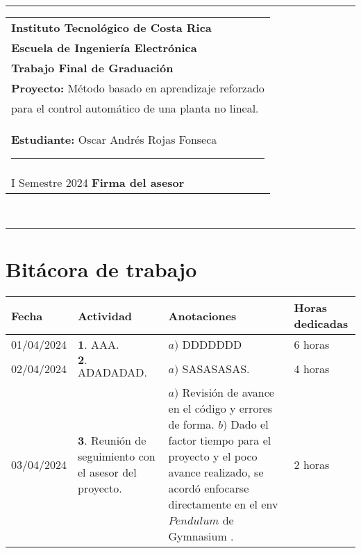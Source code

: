 \documentclass[12pt]{article}
\begin{document}
\hfill\\
\rule{\textwidth}{1.5pt}

\begin{minipage}[t]{85mm}
  \begin{tabular}{l}
    \textbf{\large Instituto Tecnológico de Costa Rica} \\  
    \textbf{Escuela de Ingeniería Electrónica} \\
    \textbf{Trabajo Final de Graduación} \\
    \textbf{Proyecto:} Método basado en aprendizaje reforzado \\para el control automático de una planta no lineal. \\
    \textbf{Estudiante:} Oscar Andrés Rojas Fonseca \hspace{3cm}\rule{4.5cm}{1.5pt}\\
    I Semestre 2024 \hspace{8.5cm}\textbf{Firma del asesor}
  \end{tabular}
\end{minipage}
\hfill\\
\rule{\textwidth}{1.5pt}


\section*{Bitácora de trabajo}

\begin{minipage}[h]{\textwidth}
	\centering
	\begin{tabularx}{\textwidth}{|p{2cm}|X|X|p{2cm}|} 
		\hline
		\rowcolor{encabezado}
		\textbf{Fecha} & 
		\textbf{Actividad} & 
		\textbf{Anotaciones} & 
		\textbf{Horas dedicadas} \\ \hline
	 	01/04/2024 & 
	 	$\mathbf{1}.$ AAA. & 
	 	$a)$ DDDDDDD \newline & 
	 	6 horas \\
		02/04/2024 & 
	 	$\mathbf{2}.$ ADADADAD. &
	 	$a)$ SASASASAS. \newline & 
	 	4 horas \\
	 	03/04/2024 & 
	 	$\mathbf{3}.$ Reunión de seguimiento con el asesor del proyecto. & 
	 	$a)$ Revisión de avance en el código y errores de forma.  \newline
	 	$b)$ Dado el factor tiempo para el proyecto y el poco avance realizado, se acordó enfocarse directamente en el env $Pendulum$ de Gymnasium \cite{gym}.  \newline & 
	 	2 horas \\
	 	\hline
	\end{tabularx}
\end{minipage}	 	
	 	
\end{document}
